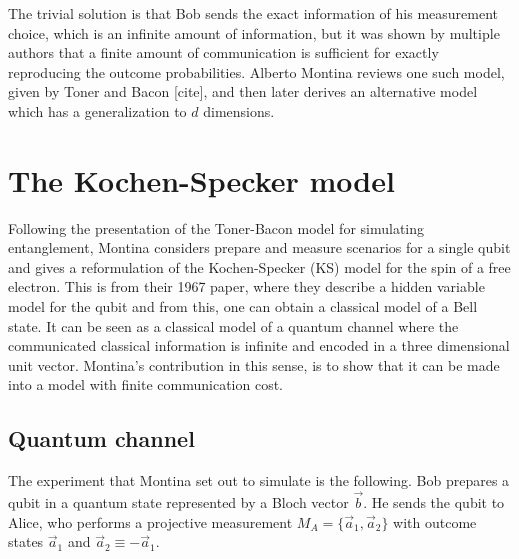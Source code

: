 \documentclass[12pt,draft]{article}
\theoremstyle{definition}
\theoremstyle{plain}
\begin{document}
    The trivial solution is that Bob sends the exact
    information of his measurement choice, which is an
    infinite amount of information, but it was shown by
    multiple authors that a finite amount of communication
    is sufficient for exactly reproducing the outcome
    probabilities. Alberto Montina reviews one such model,
    given by Toner and Bacon [cite], and then later derives
    an alternative model which has a generalization to $d$ 
    dimensions.

    \section{The Kochen-Specker model}

    Following the presentation of the Toner-Bacon model for
    simulating entanglement, Montina considers prepare and
    measure scenarios for a single qubit and gives a
    reformulation of the Kochen-Specker (KS) model for the
    spin of a free electron. This is from their 1967 paper,
    where they describe a hidden variable model for the
    qubit and from this, one can obtain a classical model of
    a Bell state.  It can be seen as a classical model of a
    quantum channel where the communicated classical
    information is infinite and encoded in a three
    dimensional unit vector. Montina's contribution in this
    sense, is to show that it can be made into a model with
    finite communication cost.

    \subsection{Quantum channel}

    The experiment that Montina set out to simulate is the
    following. Bob prepares a qubit in a quantum state
    represented by a Bloch vector $\vec b$. He sends the
    qubit to Alice, who performs a projective measurement
    $M_A = \{\vec a_1, \vec a_2\}$ with outcome states $\vec
    a_1$ and $\vec a_2 \equiv -\vec a_1$. 
\end{document}
